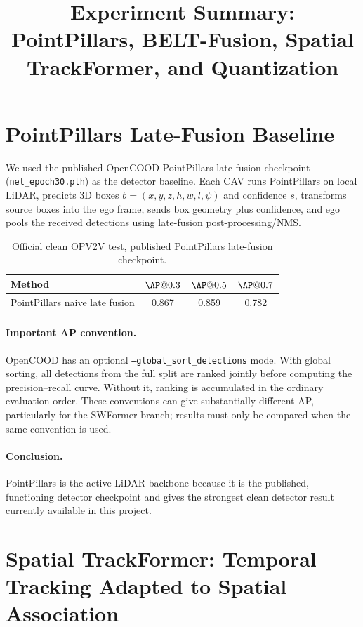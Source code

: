 \documentclass[11pt]{article}
\title{Experiment Summary: PointPillars, BELT-Fusion, Spatial TrackFormer, and Quantization}
\author{}
\date{}
\begin{document}
\maketitle

\section{PointPillars Late-Fusion Baseline}

We used the published OpenCOOD PointPillars late-fusion checkpoint (\texttt{net\_epoch30.pth}) as the detector baseline. Each CAV runs PointPillars on local LiDAR, predicts 3D boxes $b=(x,y,z,h,w,l,\psi)$ and confidence $s$, transforms source boxes into the ego frame, sends box geometry plus confidence, and ego pools the received detections using late-fusion post-processing/NMS.

\begin{table}[h]
\centering
\caption{Official clean OPV2V test, published PointPillars late-fusion checkpoint.}
\begin{tabular}{lccc}
\toprule
Method & $\AP@0.3$ & $\AP@0.5$ & $\AP@0.7$\\
\midrule
PointPillars naive late fusion & 0.867 & 0.859 & 0.782\\
\bottomrule
\end{tabular}
\end{table}

\paragraph{Important AP convention.} OpenCOOD has an optional \texttt{--global\_sort\_detections} mode. With global sorting, all detections from the full split are ranked jointly before computing the precision--recall curve. Without it, ranking is accumulated in the ordinary evaluation order. These conventions can give substantially different AP, particularly for the SWFormer branch; results must only be compared when the same convention is used.

\paragraph{Conclusion.} PointPillars is the active LiDAR backbone because it is the published, functioning detector checkpoint and gives the strongest clean detector result currently available in this project.

\section{Spatial TrackFormer: Temporal Tracking Adapted to Spatial Association}
\end{document}
